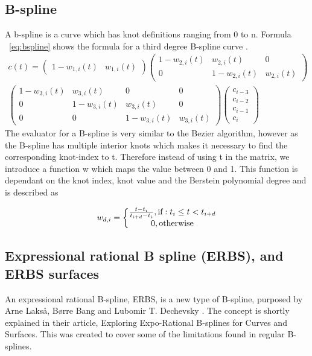 \documentclass[a4paper,11pt]{article}
\begin{document}
\subsection{B-spline}
A b-spline is a curve which has knot definitions ranging from 0 to n. Formula ~\ref{eq:bspline} shows the formula for a third degree B-spline curve \cite{book_bperbs}. 
\begin{multline} \label{eq:bspline}
c(t)=\begin{pmatrix}
1-w_{1,i}(t) & w_{1,i}(t)
\end{pmatrix}
\begin{pmatrix}
1-w_{2,i}(t) & w_{2,i}(t) & 0 \\ 
0 & 1-w_{2,i}(t) & w_{2,i}(t) 
\end{pmatrix}
\\
\begin{pmatrix}
1-w_{3,i}(t) & w_{3,i}(t) & 0 & 0\\ 
0 &  1-w_{3,i}(t) & w_{3,i}(t)  & 0 \\ 
0 & 0 &  1-w_{3,i}(t) & w_{3,i}(t) 
\end{pmatrix}
\begin{pmatrix}
c_{i-3}\\ 
c_{i-2}\\ 
c_{i-1}\\ 
c_{i}
\end{pmatrix}
\end{multline}
The evaluator for a B-spline is very similar to the Bezier algorithm, however as the B-spline has multiple interior knots which makes it necessary to find the corresponding knot-index to t. Therefore instead of using t in the matrix, we introduce a function w which maps the value between 0 and 1. This function is dependant on the knot index, knot value and the Berstein polynomial degree and is described as \cite{book_btcsc}

\begin{equation}
w_{d,i}=\left\{\begin{matrix}
\frac{t-t_{i}}{t_{i+d}-t_{i}}, \textup{if}: t_{i} \leq t < t_{i+d}\\ 
0, \textup{otherwise}
\end{matrix}\right.
\end{equation}

\subsection{Expressional rational B spline (ERBS), and ERBS surfaces}
An expressional rational B-spline, ERBS, is a new type of B-spline, purposed by Arne Lakså, Børre Bang and Lubomir T. Dechevsky \cite{rp_erbs}. The concept is shortly explained in their article, Exploring Expo-Rational B-splines for Curves and Surfaces\cite{art_eerbscs}. This was created to cover some of the limitations found in regular B-splines.
\end{document}
